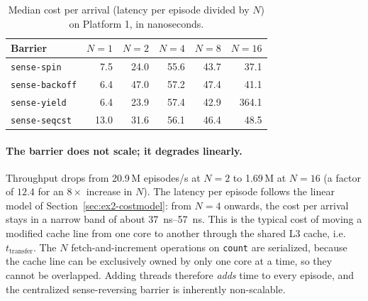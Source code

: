\begin{table}[H]
\centering
\caption{Median cost per arrival (latency per episode divided by $N$) on
Platform 1, in nanoseconds.}
\label{tab:ex2-arrival}
\small
\begin{tabular}{lrrrrr}
\toprule
\textbf{Barrier} & $N=1$ & $N=2$ & $N=4$ & $N=8$ & $N=16$ \\
\midrule
\texttt{sense-spin}    & 7.5  & 24.0 & 55.6 & 43.7 & 37.1 \\
\texttt{sense-backoff} & 6.4  & 47.0 & 57.2 & 47.4 & 41.1 \\
\texttt{sense-yield}   & 6.4  & 23.9 & 57.4 & 42.9 & 364.1 \\
\texttt{sense-seqcst}  & 13.0 & 31.6 & 56.1 & 46.4 & 48.5 \\
\bottomrule
\end{tabular}
\end{table}

\paragraph{The barrier does not scale; it degrades linearly.}
Throughput drops from 20.9\,M episodes/s at $N=2$ to 1.69\,M at $N=16$
(a factor of $12.4$ for an $8\times$ increase in $N$). The latency per
episode follows the linear model of Section~\ref{sec:ex2-costmodel}: from
$N=4$ onwards, the cost per arrival stays in a narrow band of about
\SIrange{37}{57}{\nano\second}. This is the typical cost of moving a
modified cache line from one core to another through the shared L3 cache,
i.e.\ $t_{\text{transfer}}$. The $N$ fetch-and-increment operations on
\texttt{count} are serialized, because the cache line can be exclusively
owned by only one core at a time, so they cannot be overlapped. Adding
threads therefore \emph{adds} time to every episode, and the centralized
sense-reversing barrier is inherently non-scalable.

